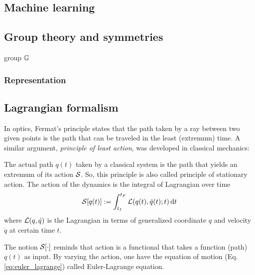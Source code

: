 \subsection{Machine learning}

\subsection{Group theory and symmetries}
group $\mathbb{G}$
\subsubsection{Representation}

\subsection{Lagrangian formalism}\label{sec:lagrangian}
\cite{xuLagrangianFormalismQuantum2021}
In optics, Fermat's principle states that the path taken by a ray between two given points is the path that can be traveled in the least (extremum) time. 
A similar argument, \emph{principle of least action}, was developed in classical mechanics:
\begin{axiom}\label{thm:least_action}
    The actual path $q(t)$ taken by a classical system is the path that 
	yields an extremum of its action \(\mathcal{S}\).
	So, this principle is also called principle of stationary action.
	The action of the dynamics is the integral of Lagrangian over time
	\begin{equation}
		\mathcal{S}[q(t)]:=\int_{t_I}^{t_F}\mathcal{L}(q(t),\dot{q}(t);t)\dd{t}
		\label{eq:action}
	\end{equation}
	where $\mathcal{L}(q,\dot{q})$ is the Lagrangian in terms of generalized coordinate $q$ and velocity $\dot{q}$ at certain time $t$. 
\end{axiom}
The notion $\mathcal{S}[\cdot]$ reminds that action is a functional that takes a function (path) $q(t)$ as input.
By varying the action, one have the equation of motion (Eq.\ref{eq:euler_lagrange}) called Euler-Lagrange equation.
